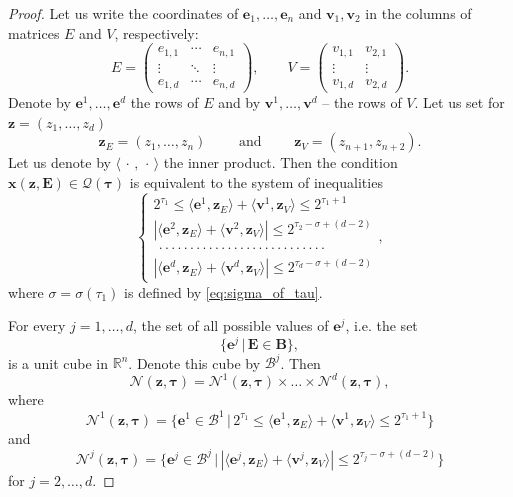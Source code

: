 \documentclass[10pt,a4paper]{amsart}
\newcommand{\R}{\mathbb{R}}
\newcommand{\bB}{\mathbf{B}}
\newcommand{\bE}{\mathbf{E}}
\newcommand{\cB}{\mathcal{B}}
\newcommand{\cN}{\mathcal{N}}
\newcommand{\cQ}{\mathcal{Q}}
\renewcommand{\leq}{\leqslant}
\renewcommand{\vec}[1]{\mathbf{#1}}
\begin{document}
\begin{proof}
  Let us write the coordinates of $\vec e_1,\ldots,\vec e_n$ and $\vec v_1,\vec v_2$ in the columns of matrices $E$ and $V$, respectively:
  \[
    E=
    \begin{pmatrix}
      e_{1,1} & \cdots & e_{n,1} \\
      \vdots  & \ddots & \vdots \\
      e_{1,d} & \cdots & e_{n,d}
    \end{pmatrix},
    \qquad
    V=
    \begin{pmatrix}
      v_{1,1} & v_{2,1} \\
      \vdots  & \vdots \\
      v_{1,d} & v_{2,d}
    \end{pmatrix}.
  \]
  Denote by $\vec e^1,\ldots,\vec e^d$ the rows of $E$ and by $\vec v^1,\ldots,\vec v^d$ -- the rows of $V$. Let us set for $\vec z=(z_1,\ldots,z_d)$
  \[
    \vec z_E=(z_1,\ldots,z_n)
    \qquad\text{ and }\qquad
    \vec z_V=(z_{n+1},z_{n+2}).
  \]
  Let us denote by $\langle\,\cdot\,,\,\cdot\,\rangle$ the inner product. Then the condition $\vec x(\vec z,\bE)\in\cQ(\pmb\tau)$ is equivalent to the system of inequalities
  \begin{equation}\label{eq:forbidden_set_system}
    \begin{cases}
      2^{\tau_1}\leq\langle\vec e^1,\vec z_E\rangle+\langle\vec v^1,\vec z_V\rangle\leq2^{\tau_1+1} \\
      |\langle\vec e^2,\vec z_E\rangle+\langle\vec v^2,\vec z_V\rangle|\leq2^{\tau_2-\sigma+(d-2)} \\
      \ \cdot\cdot\cdot\cdot\cdot\cdot\cdot\cdot\cdot\cdot\cdot\cdot\cdot\cdot\cdot\cdot\cdot\cdot\cdot\cdot\cdot\cdot\cdot\cdot\cdot\cdot\cdot \\
      |\langle\vec e^d,\vec z_E\rangle+\langle\vec v^d,\vec z_V\rangle|\leq2^{\tau_d-\sigma+(d-2)}
    \end{cases},
  \end{equation}
  where $\sigma=\sigma(\tau_1)$ is defined by \eqref{eq:sigma_of_tau}.
  
  For every $j=1,\ldots,d$, the set of all possible values of $\vec e^j$, i.e. the set
  \[
    \Big\{\vec e^j \,\Big|\, \bE\in\bB \Big\},
  \]
  is a unit cube in $\R^n$. Denote this cube by $\cB^j$. Then
  \[
    \cN(\vec z,\pmb\tau)=
    \cN^1(\vec z,\pmb\tau)\times\ldots\times\cN^d(\vec z,\pmb\tau),
  \]
  where
  \[
    \cN^1(\vec z,\pmb\tau)=
    \Big\{\vec e^1\in\cB^1 \,\Big|\, 2^{\tau_1}\leq\langle\vec e^1,\vec z_E\rangle+\langle\vec v^1,\vec z_V\rangle\leq2^{\tau_1+1} \Big\}
  \]
  and
  \[
    \cN^j(\vec z,\pmb\tau)=
    \Big\{\vec e^j\in\cB^j \,\Big|\, |\langle\vec e^j,\vec z_E\rangle+\langle\vec v^j,\vec z_V\rangle|\leq2^{\tau_j-\sigma+(d-2)} \Big\}
  \]
  for $j=2,\ldots,d$.
  

\end{proof}
\end{document}
